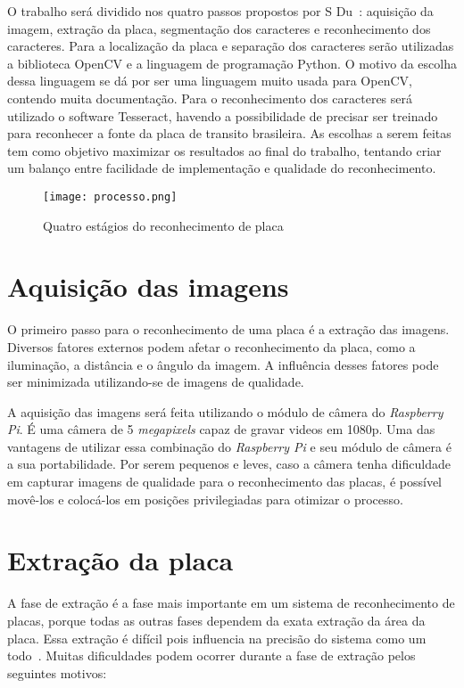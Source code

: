 O trabalho será dividido nos quatro passos propostos por S
Du~\cite{s2013automatic}: aquisição da imagem, extração da placa, segmentação
dos caracteres e reconhecimento dos caracteres. Para a localização da placa e separação dos
caracteres serão utilizadas a biblioteca OpenCV e a linguagem de programação
Python. O motivo da escolha dessa linguagem se dá por ser uma linguagem
muito usada para OpenCV\@, contendo muita documentação. Para o reconhecimento dos caracteres será utilizado o
software Tesseract, havendo a possibilidade de precisar ser treinado para
reconhecer a fonte da placa de transito brasileira. As escolhas a serem feitas
tem como objetivo maximizar os resultados ao final do trabalho, tentando criar
um balanço entre facilidade de implementação e qualidade do reconhecimento.

\begin{figure}[H]
	\centering
	\texttt{[image: processo.png]}
	\caption{Quatro estágios do reconhecimento de placa}
	\label{fig:processo}
\end{figure}

\section{Aquisição das imagens}
\label{sec:aquisicao}

O primeiro passo para o reconhecimento de uma placa é a extração das imagens. Diversos fatores
externos podem afetar o reconhecimento da placa, como a iluminação, a distância
e o ângulo da imagem. A influência desses fatores pode ser minimizada
utilizando-se de imagens de qualidade.

A aquisição das imagens será feita utilizando o módulo de câmera do
\emph{Raspberry Pi}. É uma câmera de 5 \emph{megapixels} capaz de gravar videos
em 1080p. Uma das vantagens de utilizar essa combinação do \emph{Raspberry Pi} e
seu módulo de câmera é a sua portabilidade. Por serem pequenos e leves, caso a
câmera tenha dificuldade em capturar imagens de qualidade para o reconhecimento
das placas, é possível movê-los e colocá-los em posições privilegiadas para
otimizar o processo.

\section{Extração da placa}
\label{sec:extracao}

A fase de extração é a fase mais importante em um sistema de reconhecimento de
placas, porque todas as outras fases dependem da exata extração da área da
placa. Essa extração é difícil pois influencia na precisão do sistema como um
todo~\cite{kaur2014efficient}. Muitas dificuldades podem ocorrer durante a fase
de extração pelos seguintes motivos:

